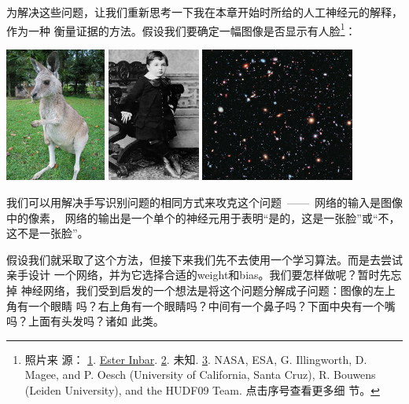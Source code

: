 为解决这些问题，让我们重新思考一下我在本章开始时所给的人工神经元的解释，作为一种
衡量证据的方法。假设我们要确定一幅图像是否显示有人脸\footnote{照片来
  源：
  \href{http://commons.wikimedia.org/wiki/File:Kangaroo_ST_03.JPG}{1}. \href{http://commons.wikimedia.org/wiki/User:ST}{Ester
    Inbar}. \href{http://commons.wikimedia.org/wiki/File:Albert_Einstein_at_the_age_of_three_(1882).jpg}{2}. 未知. \href{http://commons.wikimedia.org/wiki/File:The_Hubble_eXtreme_Deep_Field.jpg}{3}. NASA,
  ESA, G. Illingworth, D. Magee, and P. Oesch (University of California, Santa
  Cruz), R. Bouwens (Leiden University), and the HUDF09 Team. 点击序号查看更多细
  节。}：
\begin{center}
\includegraphics[height=125pt]{images/Kangaroo_ST_03}
\includegraphics[height=125pt]{images/Albert_Einstein_at_the_age_of_three_(1882)}
\includegraphics[height=125pt]{images/The_Hubble_eXtreme_Deep_Field}
\end{center}

我们可以用解决手写识别问题的相同方式来攻克这个问题~——~网络的输入是图像中的像素，
网络的输出是一个单个的神经元用于表明“是的，这是一张脸”或“不，这不是一张脸”。

假设我们就采取了这个方法，但接下来我们先不去使用一个学习算法。而是去尝试亲手设计
一个网络，并为它选择合适的\gls*{weight}和\gls*{bias}。我们要怎样做呢？暂时先忘掉
神经网络，我们受到启发的一个想法是将这个问题分解成子问题：图像的左上角有一个眼睛
吗？右上角有一个眼睛吗？中间有一个鼻子吗？下面中央有一个嘴吗？上面有头发吗？诸如
此类。

